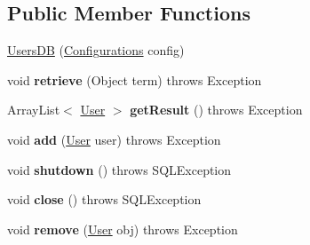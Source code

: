 \subsection*{Public Member Functions}
\begin{DoxyCompactItemize}
\item 
\hyperlink{classw3se_1_1_model_1_1_database_1_1_users_d_b_a8539c946f532fb6f534f06e0a1941c27}{Users\-D\-B} (\hyperlink{classw3se_1_1_model_1_1_configurations}{Configurations} config)
\item 
\hypertarget{classw3se_1_1_model_1_1_database_1_1_users_d_b_ae95e30d3ed1747ec85c30cbec184ea37}{void {\bfseries retrieve} (Object term)  throws Exception 	}\label{classw3se_1_1_model_1_1_database_1_1_users_d_b_ae95e30d3ed1747ec85c30cbec184ea37}

\item 
\hypertarget{classw3se_1_1_model_1_1_database_1_1_users_d_b_a92ad835eb9eaca3f5295e883e918e965}{Array\-List$<$ \hyperlink{classw3se_1_1_model_1_1_base_1_1_user}{User} $>$ {\bfseries get\-Result} ()  throws Exception 	}\label{classw3se_1_1_model_1_1_database_1_1_users_d_b_a92ad835eb9eaca3f5295e883e918e965}

\item 
\hypertarget{classw3se_1_1_model_1_1_database_1_1_users_d_b_a244f84959e2ea12a32c138832ffcde3a}{void {\bfseries add} (\hyperlink{classw3se_1_1_model_1_1_base_1_1_user}{User} user)  throws Exception 	}\label{classw3se_1_1_model_1_1_database_1_1_users_d_b_a244f84959e2ea12a32c138832ffcde3a}

\item 
\hypertarget{classw3se_1_1_model_1_1_database_1_1_users_d_b_a7a8f066f392c093d6baebdc3fe4f8f6f}{void {\bfseries shutdown} ()  throws S\-Q\-L\-Exception 	}\label{classw3se_1_1_model_1_1_database_1_1_users_d_b_a7a8f066f392c093d6baebdc3fe4f8f6f}

\item 
\hypertarget{classw3se_1_1_model_1_1_database_1_1_users_d_b_a11243db39fb4cad79ec01243c3d88159}{void {\bfseries close} ()  throws S\-Q\-L\-Exception 	}\label{classw3se_1_1_model_1_1_database_1_1_users_d_b_a11243db39fb4cad79ec01243c3d88159}

\item 
\hypertarget{classw3se_1_1_model_1_1_database_1_1_users_d_b_af8fede909d9ad493af85d991b6e6521d}{void {\bfseries remove} (\hyperlink{classw3se_1_1_model_1_1_base_1_1_user}{User} obj)  throws Exception 	}\label{classw3se_1_1_model_1_1_database_1_1_users_d_b_af8fede909d9ad493af85d991b6e6521d}

\end{DoxyCompactItemize}
